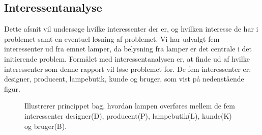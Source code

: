 \subsection{Interessentanalyse}
Dette afsnit vil undersøge hvilke interessenter der er, og hvilken interesse de har i problemet samt en eventuel løsning af problemet. Vi har udvalgt fem interessenter ud fra emnet lamper, da belysning fra lamper er det centrale i det initierende problem. Formålet med interessentanalysen er, at finde ud af hvilke interessenter som denne rapport vil løse problemet for. De fem interessenter er: designer, producent, lampebutik, kunde og bruger, som vist på nedenstående figur.

\begin{figure}[H]
	\centering
  \caption{Illustrerer princippet bag, hvordan lampen overføres mellem de fem interessenter designer(D), producent(P), lampebutik(L), kunde(K) og bruger(B).}
  \label{fig:interessenter}
\end{figure}







